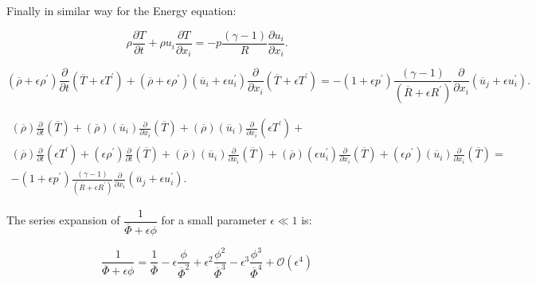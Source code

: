 Finally in similar way for the Energy equation:

\begin{equation*}
\rho
\frac{\partial  T}{\partial  t}
+
\rho
u_i
\frac{\partial  T}{\partial x_i} 
= 
-
p
\frac{(\gamma-1)}{R}
\frac{\partial u_i }{\partial x_i} 
.
\end{equation*} 

\begin{equation*}
(\overline{\rho}+\epsilon \rho^{\prime})
\frac{\partial  }{\partial  t}
(\overline{T}+\epsilon T^{\prime})
+
(\overline{\rho}+\epsilon \rho^{\prime})
(\overline{u}_i+\epsilon u_i^{\prime}) 
\frac{\partial }{\partial x_i} 
(\overline{T}+\epsilon T^{\prime})
= 
-
(1+\epsilon p^{\prime})
\frac{(\gamma-1)}{
(\overline{R}+\epsilon R^{\prime})
}
\frac{\partial}{\partial x_i} 
(\overline{u}_j+\epsilon u_i^{\prime}) 
.
\end{equation*} 

\begin{equation*}
\begin{split}
(\overline{\rho})
\frac{\partial  }{\partial  t}
(\overline{T})
+
(\overline{\rho})
(\overline{u}_i) 
\frac{\partial }{\partial x_i} 
(\overline{T})
+
(\overline{\rho})
(\overline{u}_i) 
\frac{\partial }{\partial x_i} 
(\epsilon T^{\prime})
+
\\
(\overline{\rho})
\frac{\partial  }{\partial  t}
(\epsilon T^{\prime})
+
(\epsilon \rho^{\prime})
\frac{\partial  }{\partial  t}
(\overline{T})
+
(\overline{\rho})
(\overline{u}_i) 
\frac{\partial }{\partial x_i} 
(\overline{T})
+
(\overline{\rho})
(\epsilon u_i^{\prime}) 
\frac{\partial }{\partial x_i} 
(\overline{T})
+
(\epsilon \rho^{\prime})
(\overline{u}_i) 
\frac{\partial }{\partial x_i} 
(\overline{T})
= 
\\
-
(1+\epsilon p^{\prime})
\frac{(\gamma-1)}{
(\overline{R}+\epsilon R^{\prime})
}
\frac{\partial}{\partial x_i} 
(\overline{u}_j+\epsilon u_i^{\prime}) 
.
\end{split}
\end{equation*} 


The series expansion of \(\dfrac{1}{\overline{\Phi}+\epsilon \phi}\)
 for a small parameter
\(\epsilon \ll 1\) is:

\begin{equation}
\frac{1}{\overline{\Phi}+\epsilon \phi}
=
\frac{1}{\overline{\Phi}}
-
\epsilon
\frac{\phi}{\overline{\Phi}^{2}}
+
\epsilon ^{2}
\frac{\phi^{2}}{\overline{\Phi}^{3}}
-
\epsilon^{3}
\frac{\phi^{3}}{\overline{\Phi}^{4}}
+
\mathcal{O}(\epsilon^{4})
\end{equation}

